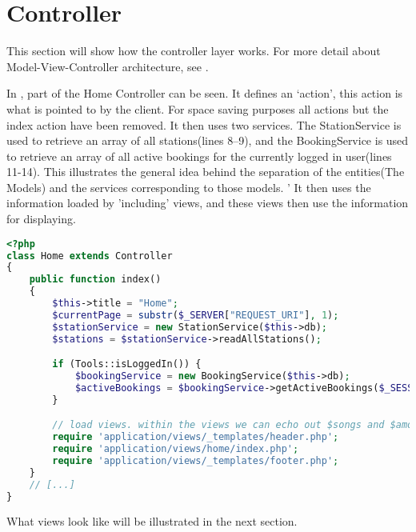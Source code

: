 \section{Controller}
This section will show how the controller layer works. For more detail about Model-View-Controller architecture, see .

In , part of the Home Controller can be seen. 
It defines an `action', this action is what is pointed to by the client. 
For space saving purposes all actions but the index action have been removed.
It then uses two services. 
The StationService is used to retrieve an array of all stations(lines 8--9), and the BookingService is used to retrieve an array of all active bookings for the currently logged in user(lines 11-14). 
This illustrates the general idea behind the separation of the entities(The Models) and the services corresponding to those models. '
It then uses the information loaded by 'including' views, and these views then use the information for displaying.

\begin{lstlisting}[language=php, label=lst:homeController, caption={Home Controller Class}]
<?php
class Home extends Controller
{
    public function index()
    {
        $this->title = "Home";
        $currentPage = substr($_SERVER["REQUEST_URI"], 1);
        $stationService = new StationService($this->db);
        $stations = $stationService->readAllStations();

        if (Tools::isLoggedIn()) {
            $bookingService = new BookingService($this->db);
            $activeBookings = $bookingService->getActiveBookings($_SESSION["login_user"]);
        }

        // load views. within the views we can echo out $songs and $amount_of_songs easily
        require 'application/views/_templates/header.php';
        require 'application/views/home/index.php';
        require 'application/views/_templates/footer.php';
    }
    // [...]
}
\end{lstlisting}

What views look like will be illustrated in the next section.